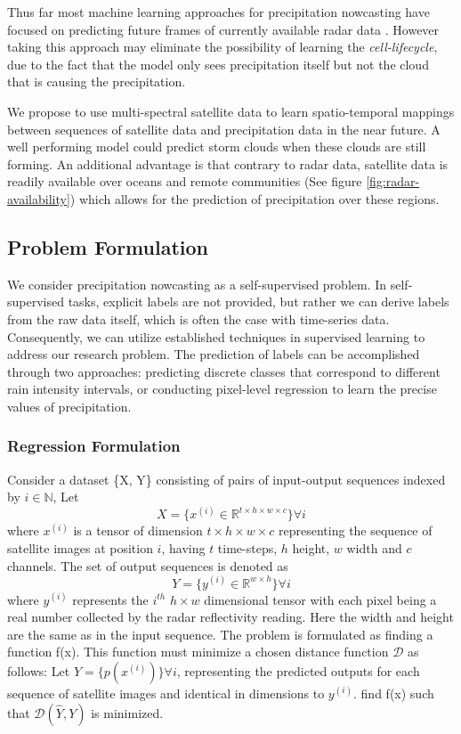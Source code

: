 Thus far most machine learning approaches for precipitation nowcasting have focused on predicting future frames of currently available radar data \cite{shi2017deep, convlstm, rainet}. However taking this approach may eliminate the possibility of learning the \textit{cell-lifecycle}, due to the fact that the model only sees precipitation itself but not the cloud that is causing the precipitation.
\medskip


We propose to use multi-spectral satellite data to learn spatio-temporal mappings between sequences of satellite data and precipitation data in the near future. A well performing model could predict storm clouds when these clouds are still forming. An additional advantage is that contrary to radar data, satellite data is readily available over oceans and remote communities (See figure \ref{fig:radar-availability}) which allows for the prediction of precipitation over these regions.
\smallskip

\subsection{Problem Formulation}
We consider precipitation nowcasting as a self-supervised problem. In self-supervised tasks, explicit labels are not provided, but rather we can derive labels from the raw data itself, which is often the case with time-series data. Consequently, we can utilize established techniques in supervised learning to address our research problem. The prediction of labels can be accomplished through two approaches: predicting discrete classes that correspond to different rain intensity intervals, or conducting pixel-level regression to learn the precise values of precipitation.

\subsubsection{Regression Formulation} Consider a dataset \{X, Y\} consisting of pairs of input-output sequences indexed by $i \in \mathbb{N}$,
Let $$X = \{x^{(i)} \in \mathbb{R}^{t \times h \times w \times c}\} \forall i$$ 
where $x^{(i)}$ is a tensor of dimension $t \times h \times w \times c$ representing the sequence of satellite images at position $i$, having $t$ time-steps, $h$ height, $w$ width and $c$ channels.
The set of output sequences is denoted as $$Y = \{y^{(i)} \in \mathbb{R}^{w\times h}\}\forall i$$
where $y^{(i)}$ represents the $i^{th}$ $h \times w$ dimensional tensor with each pixel being a real number collected by the radar reflectivity reading.
Here the width and height are the same as in the input sequence.
The problem is formulated as finding a function f(x). This function must minimize a chosen distance function $\mathcal{D}$ as follows:
Let $\hat{Y} = \{p(x^{(i)})\}\forall i$, representing the predicted outputs for each sequence of satellite images and identical in dimensions to $y^{(i)}$.
find f(x) such that $\mathcal{D}(\hat{Y}, Y)$ is minimized.

